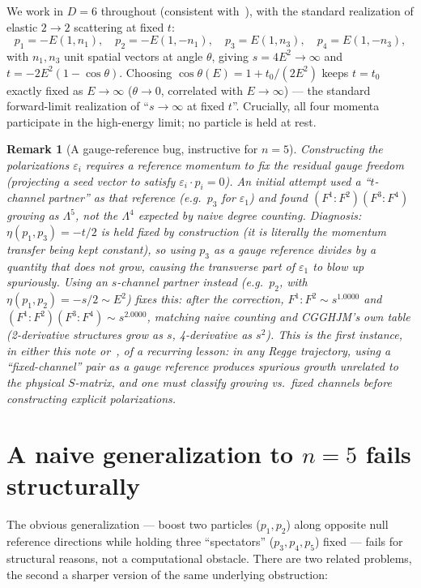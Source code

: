\documentclass[reqno]{amsart}
\newtheorem{remark}[theorem]{Remark}
\begin{document}
We work in $D=6$ throughout (consistent with~\cite{fivephotons}), with the standard realization of
elastic $2\to2$ scattering at fixed $t$:
\[
p_1=-E(1,n_1),\quad p_2=-E(1,-n_1),\quad p_3=E(1,n_3),\quad p_4=E(1,-n_3),
\]
with $n_1,n_3$ unit spatial vectors at angle $\theta$, giving $s=4E^2\to\infty$ and
$t=-2E^2(1-\cos\theta)$. Choosing $\cos\theta(E)=1+t_0/(2E^2)$ keeps $t=t_0$ exactly fixed as
$E\to\infty$ ($\theta\to0$, correlated with $E\to\infty$) --- the standard forward-limit
realization of ``$s\to\infty$ at fixed $t$''. Crucially, all four momenta participate in the
high-energy limit; no particle is held at rest.

\begin{remark}[A gauge-reference bug, instructive for $n=5$]
\label{rem:gaugebug}
Constructing the polarizations $\varepsilon_i$ requires a reference momentum to fix the residual
gauge freedom (projecting a seed vector to satisfy $\varepsilon_i\cdot p_i=0$). An initial attempt
used a ``$t$-channel partner'' as that reference (e.g.\ $p_3$ for $\varepsilon_1$) and found
$(F^1{:}F^2)(F^3{:}F^4)$ growing as $\Lambda^5$, not the $\Lambda^4$ expected by naive degree
counting. Diagnosis: $\eta(p_1,p_3)=-t/2$ is held \emph{fixed} by construction (it is literally the
momentum transfer being kept constant), so using $p_3$ as a gauge reference divides by a quantity
that does not grow, causing the transverse part of $\varepsilon_1$ to blow up spuriously. Using an
\emph{$s$-channel partner} instead (e.g.\ $p_2$, with $\eta(p_1,p_2)=-s/2\sim E^2$) fixes this:
after the correction, $F^1{:}F^2\sim s^{1.0000}$ and $(F^1{:}F^2)(F^3{:}F^4)\sim s^{2.0000}$,
matching naive counting and CGGHJM's own table (2-derivative structures grow as $s$, 4-derivative
as $s^2$). This is the first instance, in either this note or~\cite{fivephotons}, of a recurring
lesson: in any Regge trajectory, using a ``fixed-channel'' pair as a gauge reference produces
spurious growth unrelated to the physical $S$-matrix, and one must classify growing vs.\ fixed
channels \emph{before} constructing explicit polarizations.
\end{remark}

\section{A naive generalization to \texorpdfstring{$n=5$}{n=5} fails structurally}
\label{sec:naive}

The obvious generalization --- boost two particles ($p_1,p_2$) along opposite null reference
directions while holding three ``spectators'' ($p_3,p_4,p_5$) fixed --- fails for structural
reasons, not a computational obstacle. There are two related problems, the second a sharper
version of the same underlying obstruction:
\end{document}
